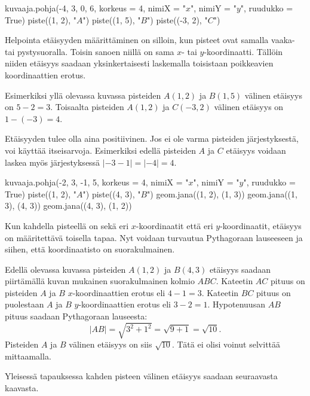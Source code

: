 \begin{kuva}
    kuvaaja.pohja(-4, 3, 0, 6, korkeus = 4, nimiX = "$x$", nimiY = "$y$", ruudukko = True)
    piste((1, 2), "$A$")
    piste((1, 5), "$B$")
    piste((-3, 2), "$C$")
\end{kuva}

Helpointa etäisyyden määrittäminen on silloin, kun pisteet ovat samalla vaaka- tai pystysuoralla.
Toisin sanoen niillä on sama $x$- tai $y$-koordinaatti.
Tällöin niiden etäisyys saadaan yksinkertaisesti laskemalla toisistaan poikkeavien koordinaattien erotus.

Esimerkiksi yllä olevassa kuvassa pisteiden $A(1, 2)$ ja $B(1, 5)$ välinen etäisyys on $5-2=3$.
Toisaalta pisteiden $A(1, 2)$ ja $C(-3, 2)$ välinen etäisyys on $1-(-3)=4$.

Etäisyyden tulee olla aina positiivinen.
Jos ei ole varma pisteiden järjestyksestä, voi käyttää itseisarvoja.
Esimerkiksi edellä pisteiden $A$ ja $C$ etäisyys voidaan laskea myös järjestyksessä $|-3-1|=|-4|=4$.


\begin{kuva}
    kuvaaja.pohja(-2, 3, -1, 5, korkeus = 4, nimiX = "$x$", nimiY = "$y$", ruudukko = True)
    piste((1, 2), "$A$")
    piste((4, 3), "$B$")
    geom.jana((1, 2), (1, 3))
    geom.jana((1, 3), (4, 3))
    geom.jana((4, 3), (1, 2))
\end{kuva}

Kun kahdella pisteellä on sekä eri $x$-koordinaatit että eri $y$-koordinaatit, etäisyys on määritettävä toisella tapaa.
Nyt voidaan turvautua Pythagoraan lauseeseen ja siihen, että koordinaatisto on suorakulmainen.

Edellä olevassa kuvassa pisteiden $A(1, 2)$ ja $B(4, 3)$ etäisyys saadaan piirtämällä kuvan mukainen suorakulmainen kolmio $ABC$.
Kateetin $AC$ pituus on pisteiden $A$ ja $B$ $x$-koordinaattien erotus eli $4-1=3$.
Kateetin $BC$ pituus on puolestaan $A$ ja $B$ $y$-koordinaattien erotus eli $3-2=1$.
Hypotenuusan $AB$ pituus saadaan Pythagoraan lauseesta:
\[
|AB|=\sqrt{3^2+1^2}=\sqrt{9+1}=\sqrt{10}.
\]
Pisteiden $A$ ja $B$ välinen etäisyys on siis $\sqrt{10}$.
Tätä ei olisi voinut selvittää mittaamalla.

Yleisessä tapauksessa kahden pisteen välinen etäisyys saadaan seuraavasta kaavasta.

